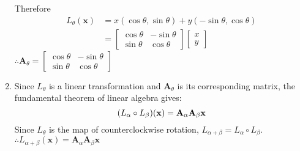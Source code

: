 \documentclass[10pt]{article}
\begin{document}
\begin{enumerate}[leftmargin=*, label={(\alph*)}]
    Therefore
    \begin{align*}
        L_\theta(\mathbf{x}) &= x(\cos\theta, \sin\theta) + y(-\sin\theta, \cos\theta) \\
        &= \begin{bmatrix}
            \cos\theta & -\sin\theta \\ \sin\theta & \cos\theta
        \end{bmatrix}\begin{bmatrix}
            x \\ y
        \end{bmatrix}
    \end{align*}
    $\therefore \mathbf{A}_\theta = \begin{bmatrix}
        \cos\theta & -\sin\theta \\ \sin\theta & \cos\theta
    \end{bmatrix}$
    \item Since $L_\theta$ is a linear transformation and $\mathbf{A}_\theta$ is its corresponding matrix, the fundamental theorem of linear algebra gives:
    $$\qty(L_\alpha \circ L_\beta)(\mathbf{x}) = \mathbf{A}_\alpha\mathbf{A}_\beta\mathbf{x}$$
    Since $L_\theta$ is the map of counterclockwise rotation, $L_{\alpha+\beta} = L_\alpha \circ L_\beta$. $\therefore L_{\alpha+\beta}(\mathbf{x}) = \mathbf{A}_\alpha\mathbf{A}_\beta\mathbf{x}$
    \vspace{2mm}
    

\end{enumerate}
\end{document}
